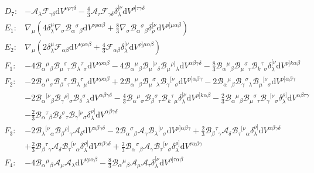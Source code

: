 \documentclass{article}
\providecommand{\B}[3]{\mathcal{B}_{#1}{}^{ #2}{}_{#3}}
\providecommand{\A}[1]{\mathcal{A}_{#1}}
\providecommand{\deV}[1]{\mathrm{d}V^{#1}}
\begin{document}
\begin{align*}
    D_7: & -\A{\lambda}\mathcal{F}_{\gamma\delta}\deV{\nu\rho\gamma\delta} - \frac{4}{3}\A{\tau}\mathcal{F}_{\gamma\delta} \delta^{[\nu}_{\lambda}\deV{\rho]\tau\gamma\delta}\\
    E_1: & \nabla_\mu \left( 4\delta^\mu_\lambda \nabla_\sigma \B{\alpha}{\sigma}{\beta}\deV{\nu\rho\alpha\beta} + \frac{8}{3}\nabla_\sigma \B{\alpha}{\sigma}{\beta}\delta^{[\nu}_\rho \deV{\rho]\mu\alpha\beta}\right) \\
    E_2: & \nabla_\mu \left(2\delta^\mu_\lambda \mathcal{F}_{\alpha\beta}\deV{\nu\rho\alpha\beta} + \frac{4}{3}\mathcal{F}_{\alpha\beta}\delta^{[\nu}_\lambda\deV{\rho]\mu\alpha\beta}\right)\\
    F_1: & -4\B{\alpha}{\mu}{\beta}\B{\mu}{\sigma}{\tau}\B{\lambda}{\tau}{\sigma}\deV{\nu\rho\alpha\beta} -4\B{\alpha}{\mu}{\beta}\B{\mu}{[\nu}{\delta}\B{\mu}{\rho]}{\lambda}\deV{\alpha\beta\gamma\delta}  -\frac{8}{3}\B{\alpha}{\mu}{\beta}\B{\mu}{\sigma}{\tau}\B{k}{\tau}{\sigma}\delta^{[\nu}_\lambda\deV{\rho]k\alpha\beta} \\
    F_2: & -2\B{\alpha}{\mu}{\sigma}\B{\beta}{\sigma}{\tau}\B{\lambda}{\tau}{\mu}\deV{\nu\rho\alpha\beta} + 2\B{\alpha}{\mu}{\beta}\B{\mu}{\sigma}{\lambda}\B{\gamma}{[\nu}{\sigma}\deV{\rho]\alpha\beta\gamma} - 2\B{\alpha}{\mu}{\beta}\B{\gamma}{\sigma}{\lambda}\B{\mu}{[\nu}{\sigma}\deV{\rho]\alpha\beta\gamma} \\
        & -2\B{\alpha}{[\nu}{\beta}\B{\gamma}{\rho]}{\sigma}\B{\delta}{\sigma}{\lambda}\deV{\alpha\beta\gamma\delta} -\frac{4}{3}\B{\alpha}{\mu}{\sigma}\B{\beta}{\sigma}{\tau}\B{k}{\tau}{\mu}\delta^{[\nu}_{\lambda}\deV{\rho]k\alpha\beta} - \frac{2}{3}\B{\alpha}{\mu}{\beta}\B{\mu}{\sigma}{\tau}\B{\gamma}{[\nu}{\sigma}\delta^{\rho]}_\lambda\deV{\alpha\beta\tau\gamma} \\
        & -\frac{2}{3}\B{\alpha}{\tau}{\beta}\B{\delta}{\sigma}{\tau}\B{\gamma}{[\nu}{\sigma}\delta^{\rho]}_\lambda \deV{\alpha\beta\gamma\delta}\\
    F_3: & -2\B{\lambda}{[\nu}{\alpha}\B{\beta}{\rho]}{\gamma}\A{\delta}\deV{\alpha\beta\gamma\delta} -2\B{\alpha}{\sigma}{\beta}\A{\gamma}\B{\lambda}{[\nu}{\sigma}\deV{\rho]\alpha\beta\gamma} + \frac{2}{3}\B{\beta}{\tau}{\gamma}\A{\delta}\B{\tau}{[\nu}{\alpha}\delta^{\rho]}_{\lambda}\deV{\alpha\beta\gamma\delta} \\
        & + \frac{2}{3}\B{\beta}{\tau}{\gamma}\A{\delta}\B{\tau}{[\nu}{\alpha}\delta^{\rho]}_{\lambda}\deV{\alpha\beta\gamma\delta} + \frac{2}{3}\B{\alpha}{\sigma}{\beta}\A{\gamma}\B{\tau}{[\nu}{\sigma}\delta^{\rho]}_{\lambda}\deV{\tau\alpha\beta\gamma}\\
    F_4: & -4\B{\alpha}{\mu}{\beta}\A{\mu}\A{\lambda}\deV{\nu\rho\alpha\beta} - \frac{8}{3}\B{\alpha}{\mu}{\beta}\A{\mu}\A{\tau}\delta^{[\nu}_{\lambda}\deV{\rho]\tau\alpha\beta} 
\end{align*}
\end{document}
